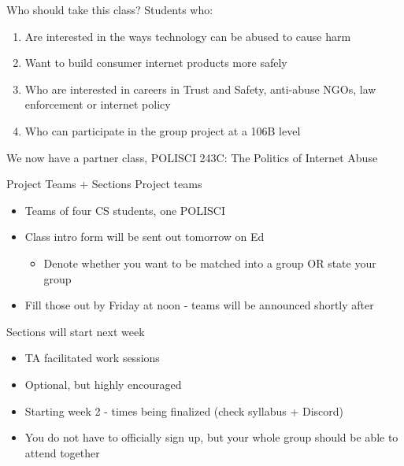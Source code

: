 \documentclass[nobackground,dvipsnames,table]{beamer}
\begin{document}
\begin{frame}{Who should take this class?}
    Students who:
    \begin{enumerate}
        \item Are interested in the ways technology can be abused to cause harm
        \item Want to build consumer internet products more safely
        \item Who are interested in careers in Trust and Safety, anti-abuse NGOs, law enforcement or internet policy
        \item Who can participate in the group project at a 106B level
    \end{enumerate}

    We now have a partner class, POLISCI 243C: The Politics of Internet Abuse
\end{frame}

\begin{frame}{Project Teams + Sections}
    Project teams
    \begin{itemize}
        \item Teams of four CS students, one POLISCI
        \item Class intro form will be sent out tomorrow on Ed
        \begin{itemize}
            \item Denote whether you want to be matched into a group OR state your group
        \end{itemize}
        \item Fill those out by Friday at noon - teams will be announced shortly after
    \end{itemize}
    
    Sections will start next week
    \begin{itemize}
        \item TA facilitated work sessions
        \item Optional, but highly encouraged 
        \item Starting week 2 - times being finalized (check syllabus + Discord)
        \item You do not have to officially sign up, but your whole group should be able to attend together
    \end{itemize}
\end{frame}
\end{document}
